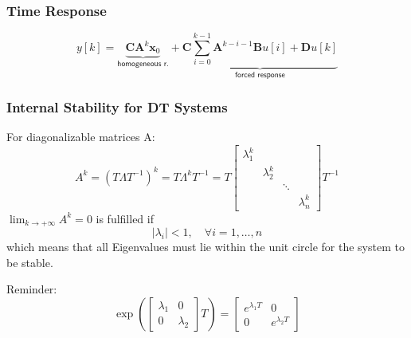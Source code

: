 \subsubsection{Time Response}
\noindent\begin{equation*}
    y[k]=\underbrace{\textbf{CA}^{k}\textbf{x}_0}_{\textsf{homogeneous r.}} + \underbrace{\textbf{C}\sum_{i=0}^{k-1}\textbf{A}^{k-i-1}\textbf{B} u[i]+\textbf{D} u[k]}_{\textsf{forced response}}
\end{equation*}


\subsubsection{Internal Stability for DT Systems}

For diagonalizable matrices A:\
\begin{equation*}
    A^k ={(T\Lambda T^{-1})}^k=T\Lambda^{k}T^{-1}=T
    \begin{bmatrix}
        \lambda_1^k &             &        &             \\
                    & \lambda_2^k &        &             \\
                    &             & \ddots &             \\
                    &             &        & \lambda_n^k
    \end{bmatrix}T^{-1}
\end{equation*}
$\lim_{k\to+\infty}A^k=0$ is fulfilled if
\begin{equation*}
    |\lambda_i| <1,\quad\forall i=1,\ldots,n
\end{equation*}
which means that all Eigenvalues must lie within the unit circle for the system to be stable.

Reminder:
\begin{equation*}
    \exp\left(
    \begin{bmatrix}
        \lambda_1 & 0         \\
        0         & \lambda_2
    \end{bmatrix}
    T\right) =
    \begin{bmatrix}
        e^{\lambda_{1}T} & 0                \\
        0                & e^{\lambda_{2}T}
    \end{bmatrix}
\end{equation*}

